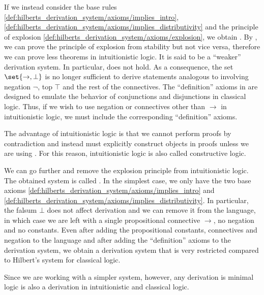 \begin{remark}
\begin{remenum}
    \mcite\cite[def 53.10]{OpenLogic20201202}If we instead consider the base rules \eqref{def:hilberts_derivation_system/axioms/implies_intro}, \eqref{def:hilberts_derivation_system/axioms/implies_distributivity} and the principle of explosion \eqref{def:hilberts_derivation_system/axioms/explosion}, we obtain . By , we can prove the principle of explosion from stability but not vice versa, therefore we can prove less theorems in intuitionistic logic. It is said to be a \enquote{weaker} derivation system. In particular,  does not hold. As a consequence, the set \( \set{ \to, \bot } \) is no longer sufficient to derive statements analogous to  involving negation \( \neg \), top \( \top \) and the rest of the connectives. The \enquote{definition} axioms in  are designed to emulate the behavior of conjunctions and disjunctions in classical logic. Thus, if we wish to use negation or connectives other than \( \to \) in intuitionistic logic, we must include the corresponding \enquote{definition} axioms.

    The advantage of intuitionistic logic is that we cannot perform proofs by contradiction and instead must explicitly construct objects in proofs unless we are using . For this reason, intuitionistic logic is also called constructive logic.

     We can go further and remove the explosion principle from intuitionistic logic. The obtained system is called . In the simplest case, we only have the two base axioms \eqref{def:hilberts_derivation_system/axioms/implies_intro} and \eqref{def:hilberts_derivation_system/axioms/implies_distributivity}. In particular, the falsum \( \bot \) does not affect derivation and we can remove it from the language, in which case we are left with a single propositional connective \( \to \), no negation and no constants. Even after adding the propositional constants, connectives and negation to the language and after adding the \enquote{definition} axioms to the derivation system, we obtain a derivation system that is very restricted compared to Hilbert's system for classical logic.

    Since we are working with a simpler system, however, any derivation is minimal logic is also a derivation in intuitionistic and classical logic.
  \end{remenum}
\end{remark}

